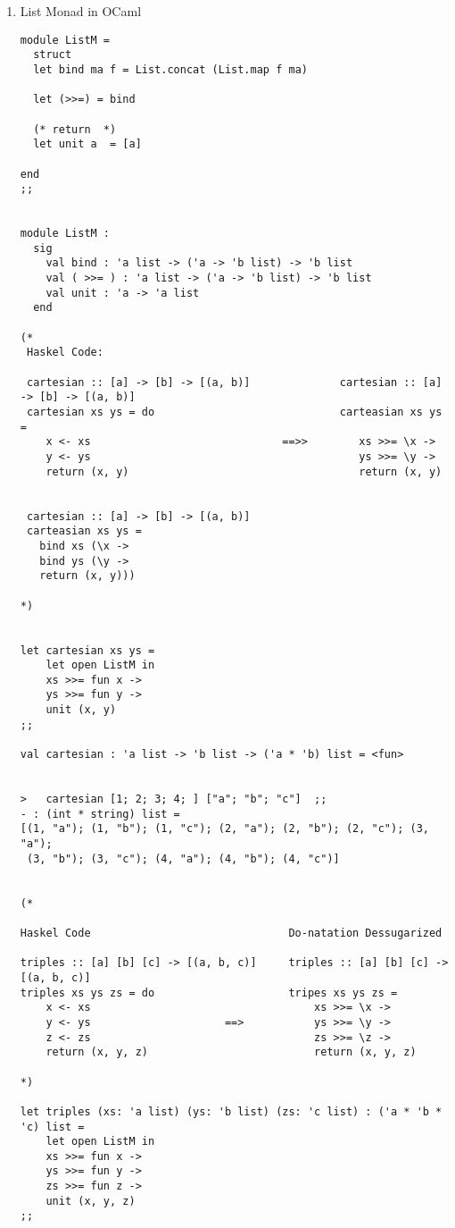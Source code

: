 \documentclass[11pt]{article}
\begin{document}
\begin{enumerate}
\item List Monad in OCaml
\label{sec-1-13-2-2}

\begin{verbatim}
module ListM =
  struct 
  let bind ma f = List.concat (List.map f ma)

  let (>>=) = bind 

  (* return  *)
  let unit a  = [a]

end
;;


module ListM :
  sig
    val bind : 'a list -> ('a -> 'b list) -> 'b list
    val ( >>= ) : 'a list -> ('a -> 'b list) -> 'b list
    val unit : 'a -> 'a list
  end

(*
 Haskel Code:

 cartesian :: [a] -> [b] -> [(a, b)]              cartesian :: [a] -> [b] -> [(a, b)]   
 cartesian xs ys = do                             carteasian xs ys = 
    x <- xs                              ==>>        xs >>= \x ->    
    y <- ys                                          ys >>= \y -> 
    return (x, y)                                    return (x, y)


 cartesian :: [a] -> [b] -> [(a, b)] 
 carteasian xs ys = 
   bind xs (\x -> 
   bind ys (\y -> 
   return (x, y)))

*)


let cartesian xs ys = 
    let open ListM in 
    xs >>= fun x -> 
    ys >>= fun y ->
    unit (x, y)
;;

val cartesian : 'a list -> 'b list -> ('a * 'b) list = <fun>


>   cartesian [1; 2; 3; 4; ] ["a"; "b"; "c"]  ;;
- : (int * string) list =
[(1, "a"); (1, "b"); (1, "c"); (2, "a"); (2, "b"); (2, "c"); (3, "a");
 (3, "b"); (3, "c"); (4, "a"); (4, "b"); (4, "c")]


(*

Haskel Code                               Do-natation Dessugarized
                                                       
triples :: [a] [b] [c] -> [(a, b, c)]     triples :: [a] [b] [c] -> [(a, b, c)]
triples xs ys zs = do                     tripes xs ys zs = 
    x <- xs                                   xs >>= \x ->
    y <- ys                     ==>           ys >>= \y ->
    z <- zs                                   zs >>= \z ->
    return (x, y, z)                          return (x, y, z)  

*)

let triples (xs: 'a list) (ys: 'b list) (zs: 'c list) : ('a * 'b * 'c) list =
    let open ListM in 
    xs >>= fun x ->
    ys >>= fun y ->
    zs >>= fun z -> 
    unit (x, y, z)
;;


\end{verbatim}
\end{enumerate}
\end{document}
